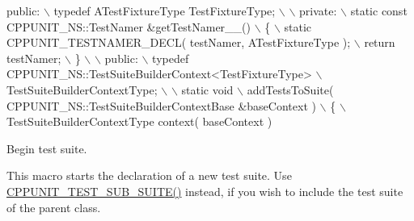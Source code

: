 \begin{DoxyCode}
\textcolor{keyword}{public}:                                                                   \(\backslash\)
    typedef ATestFixtureType TestFixtureType;                               \(\backslash\)
                                                                            \(\backslash\)
  private:                                                                  \(\backslash\)
    static \textcolor{keyword}{const} CPPUNIT\_NS::TestNamer &getTestNamer\_\_()                    \(\backslash\)
    \{                                                                       \(\backslash\)
      static CPPUNIT\_TESTNAMER\_DECL( testNamer, ATestFixtureType );         \(\backslash\)
      return testNamer;                                                     \(\backslash\)
    \}                                                                       \(\backslash\)
                                                                            \(\backslash\)
  public:                                                                   \(\backslash\)
    typedef CPPUNIT\_NS::TestSuiteBuilderContext<TestFixtureType>            \(\backslash\)
                TestSuiteBuilderContextType;                                \(\backslash\)
                                                                            \(\backslash\)
    static void                                                             \(\backslash\)
    addTestsToSuite( CPPUNIT\_NS::TestSuiteBuilderContextBase &baseContext ) \(\backslash\)
    \{                                                                       \(\backslash\)
      TestSuiteBuilderContextType context( baseContext )
\end{DoxyCode}


Begin test suite. 

This macro starts the declaration of a new test suite. Use \hyperlink{group___writing_test_fixture_gae19f30ade82172cf6c3ff297367a10c2}{C\-P\-P\-U\-N\-I\-T\-\_\-\-T\-E\-S\-T\-\_\-\-S\-U\-B\-\_\-\-S\-U\-I\-T\-E()} instead, if you wish to include the test suite of the parent class.


